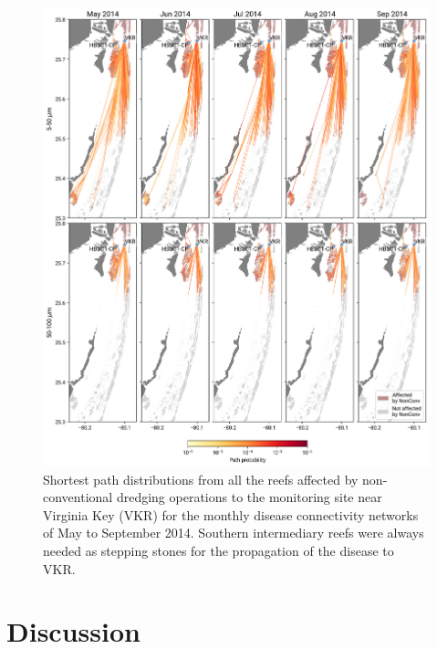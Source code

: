 \documentclass[preprint,12pt,authoryear]{elsarticle}
\begin{document}
\begin{figure}
	\centering
	\includegraphics[width=\textwidth]{figures/figure_new_shortest_paths.png}
    \caption{Shortest path distributions from all the reefs affected by non-conventional dredging operations to the monitoring site near Virginia Key (VKR) for the monthly disease connectivity networks of May to September 2014. Southern intermediary reefs were always needed as stepping stones for the propagation of the disease to VKR.}
	\label{fig:onset_path}
\end{figure}

\section{Discussion}

\end{document}

